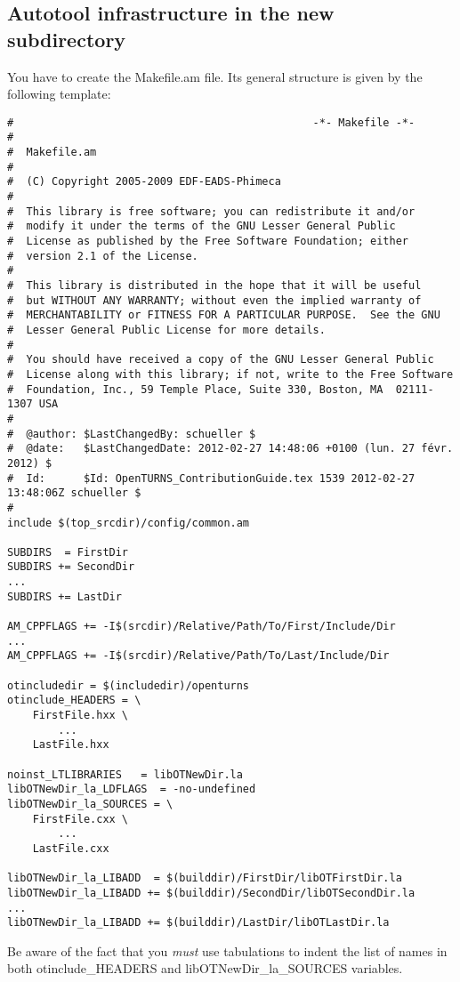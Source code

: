 \documentclass[11pt]{article}
\begin{document}
\subsection{Autotool infrastructure in the new subdirectory}
You have to create the Makefile.am file. Its general structure is given by the following template:
\begin{verbatim}
#                                               -*- Makefile -*-
#
#  Makefile.am
#
#  (C) Copyright 2005-2009 EDF-EADS-Phimeca
#
#  This library is free software; you can redistribute it and/or
#  modify it under the terms of the GNU Lesser General Public
#  License as published by the Free Software Foundation; either
#  version 2.1 of the License.
#
#  This library is distributed in the hope that it will be useful
#  but WITHOUT ANY WARRANTY; without even the implied warranty of
#  MERCHANTABILITY or FITNESS FOR A PARTICULAR PURPOSE.  See the GNU
#  Lesser General Public License for more details.
#
#  You should have received a copy of the GNU Lesser General Public
#  License along with this library; if not, write to the Free Software
#  Foundation, Inc., 59 Temple Place, Suite 330, Boston, MA  02111-1307 USA
#
#  @author: $LastChangedBy: schueller $
#  @date:   $LastChangedDate: 2012-02-27 14:48:06 +0100 (lun. 27 févr. 2012) $
#  Id:      $Id: OpenTURNS_ContributionGuide.tex 1539 2012-02-27 13:48:06Z schueller $
#
include $(top_srcdir)/config/common.am

SUBDIRS  = FirstDir
SUBDIRS += SecondDir
...
SUBDIRS += LastDir

AM_CPPFLAGS += -I$(srcdir)/Relative/Path/To/First/Include/Dir
...
AM_CPPFLAGS += -I$(srcdir)/Relative/Path/To/Last/Include/Dir

otincludedir = $(includedir)/openturns
otinclude_HEADERS = \
	FirstFile.hxx \
        ...
	LastFile.hxx

noinst_LTLIBRARIES   = libOTNewDir.la
libOTNewDir_la_LDFLAGS  = -no-undefined
libOTNewDir_la_SOURCES = \
	FirstFile.cxx \
        ...
	LastFile.cxx

libOTNewDir_la_LIBADD  = $(builddir)/FirstDir/libOTFirstDir.la
libOTNewDir_la_LIBADD += $(builddir)/SecondDir/libOTSecondDir.la
...
libOTNewDir_la_LIBADD += $(builddir)/LastDir/libOTLastDir.la
\end{verbatim}
Be aware of the fact that you \emph{must} use tabulations to indent the list of names in both otinclude\_HEADERS and libOTNewDir\_la\_SOURCES variables.
\end{document}
